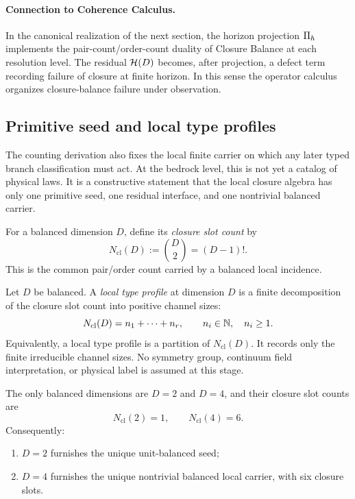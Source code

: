 \paragraph{Connection to Coherence Calculus.}
In the canonical realization of the next section, the horizon projection
$\Pi_{h}$ implements the pair-count/order-count duality of Closure Balance at
each resolution level. The residual $\mathcal{H}(D)$ becomes, after projection, a
defect term recording failure of closure at finite horizon. In this sense the
operator calculus organizes closure-balance failure under observation.


\subsection{Primitive seed and local type profiles}

The counting derivation also fixes the local finite carrier on which any later
typed branch classification must act. At the bedrock level, this is not yet a
catalog of physical laws. It is a constructive statement that the local
closure algebra has only one primitive seed, one residual interface, and one
nontrivial balanced carrier.

\begin{definition}
\label{def:balanced-closure-slot-count}
For a balanced dimension $D$, define its \emph{closure slot count} by
\[
N_{\mathrm{cl}}(D) := \binom{D}{2} = (D-1)!.
\]
This is the common pair/order count carried by a balanced local incidence.
\end{definition}

\begin{definition}
\label{def:local-type-profile}
Let $D$ be balanced. A \emph{local type profile} at dimension $D$ is a finite
decomposition of the closure slot count into positive channel sizes:
\[
N_{\mathrm{cl}}(D)=n_1+\cdots+n_r,
\qquad
n_i\in\mathbb{N},\quad n_i\ge 1.
\]
Equivalently, a local type profile is a partition of $N_{\mathrm{cl}}(D)$.
It records only the finite irreducible channel sizes. No symmetry group,
continuum field interpretation, or physical label is assumed at this stage.
\end{definition}

\begin{theorem}
\label{thm:unit-seed-and-six-slot-carrier}
The only balanced dimensions are $D=2$ and $D=4$, and their closure slot
counts are
\[
N_{\mathrm{cl}}(2)=1,
\qquad
N_{\mathrm{cl}}(4)=6.
\]
Consequently:
\begin{enumerate}[label=(\roman*), itemsep=0.2em]
\item $D=2$ furnishes the unique unit-balanced seed;
\item $D=4$ furnishes the unique nontrivial balanced local carrier, with six
      closure slots.
\end{enumerate}
\end{theorem}

